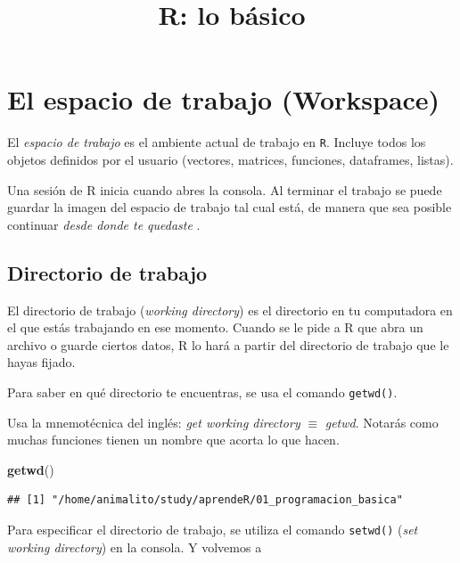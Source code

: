\documentclass[]{article}
\title{R: lo básico}
\author{}
\date{}
\newenvironment{Shaded}{\begin{snugshade}}{\end{snugshade}}
\newcommand{\KeywordTok}[1]{\textcolor[rgb]{0.13,0.29,0.53}{\textbf{{#1}}}}
\newcommand{\NormalTok}[1]{{#1}}
\begin{document}
\maketitle

\section{El espacio de trabajo
(Workspace)}\label{el-espacio-de-trabajo-workspace}

El \emph{espacio de trabajo} es el ambiente actual de trabajo en
\texttt{R}. Incluye todos los objetos definidos por el usuario
(vectores, matrices, funciones, dataframes, listas).

Una sesión de R inicia cuando abres la consola. Al terminar el trabajo
se puede guardar la imagen del espacio de trabajo tal cual está, de
manera que sea posible continuar \emph{desde donde te quedaste}
\parencite[][p. 11]{kabacoff2015r}.

\subsection{Directorio de trabajo}\label{directorio-de-trabajo}

El directorio de trabajo (\emph{working directory}) es el directorio en
tu computadora en el que estás trabajando en ese momento. Cuando se le
pide a R que abra un archivo o guarde ciertos datos, R lo hará a partir
del directorio de trabajo que le hayas fijado.

Para saber en qué directorio te encuentras, se usa el comando
\texttt{getwd()}.

\begin{curiosidad} 
Usa la mnemotécnica del inglés: \textit{get working directory} $\equiv$ \textit{getwd}. 
Notarás como muchas funciones tienen un nombre que acorta lo que hacen.
\end{curiosidad}

\begin{Shaded}
\begin{Highlighting}[]
\KeywordTok{getwd}\NormalTok{()}
\end{Highlighting}
\end{Shaded}

\begin{verbatim}
## [1] "/home/animalito/study/aprendeR/01_programacion_basica"
\end{verbatim}

Para especificar el directorio de trabajo, se utiliza el comando
\texttt{setwd()} (\emph{set working directory}) en la consola. Y
volvemos a
\end{document}
